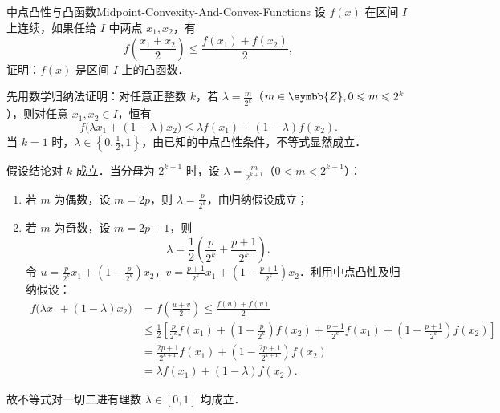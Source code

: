 \begin{problem}{中点凸性与凸函数}{Midpoint-Convexity-And-Convex-Functions}
    设 $f(x)$ 在区间 $I$ 上连续，如果任给 $I$ 中两点 $x_1, x_2$，有
    \begin{equation}
        f\left( \frac{x_1 + x_2}{2} \right) \leqslant \frac{f(x_1) + f(x_2)}{2},
    \end{equation}
    证明：$f(x)$ 是区间 $I$ 上的凸函数．
\end{problem}

\begin{myproof}
    先用数学归纳法证明：对任意正整数 $k$，若 $\lambda = \frac{m}{2^k}$（$m \in \symbb{Z}, 0 \leqslant m \leqslant 2^k$），则对任意 $x_1, x_2 \in I$，恒有
    \begin{equation}
        f\bigl( \lambda x_1 + (1 - \lambda)x_2 \bigr) \leqslant \lambda f(x_1) + (1 - \lambda)f(x_2).
    \end{equation}
    当 $k = 1$ 时，$\lambda \in \left\{ 0, \frac{1}{2}, 1 \right\}$，由已知的中点凸性条件，不等式显然成立．

    假设结论对 $k$ 成立．当分母为 $2^{k+1}$ 时，设 $\lambda = \frac{m}{2^{k+1}}$（$0 < m < 2^{k+1}$）：
    \begin{enumerate}
        \item 若 $m$ 为偶数，设 $m = 2p$，则 $\lambda = \frac{p}{2^k}$，由归纳假设成立；
        \item 若 $m$ 为奇数，设 $m = 2p + 1$，则
              \begin{equation}
                  \lambda = \frac{1}{2}\left( \frac{p}{2^k} + \frac{p+1}{2^k} \right).
              \end{equation}
              令 $u = \frac{p}{2^k} x_1 + \left(1 - \frac{p}{2^k}\right)x_2$，$v = \frac{p+1}{2^k} x_1 + \left(1 - \frac{p+1}{2^k}\right)x_2$．利用中点凸性及归纳假设：
              \begin{equation}
                  \begin{aligned}
                      f\bigl( \lambda x_1 + (1 - \lambda)x_2 \bigr) & = f\left( \frac{u + v}{2} \right) \leqslant \frac{f(u) + f(v)}{2}                                                                                                 \\
                                                                    & \leqslant \frac{1}{2}\left[ \frac{p}{2^k} f(x_1) + \left(1 - \frac{p}{2^k}\right)f(x_2) + \frac{p+1}{2^k} f(x_1) + \left(1 - \frac{p+1}{2^k}\right)f(x_2) \right] \\
                                                                    & = \frac{2p + 1}{2^{k+1}} f(x_1) + \left(1 - \frac{2p + 1}{2^{k+1}}\right)f(x_2)                                                                                   \\
                                                                    & = \lambda f(x_1) + (1 - \lambda)f(x_2).
                  \end{aligned}
              \end{equation}
    \end{enumerate}
    故不等式对一切二进有理数 $\lambda \in [0, 1]$ 均成立．


\end{myproof}
